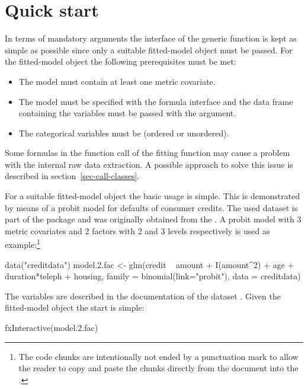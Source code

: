 \documentclass[nojss]{jss}
\begin{document}
\section{Quick start} \label{sec-quickstart}
In terms of mandatory arguments the interface of the generic function   is kept as simple as possible since only a suitable fitted-model object must be passed. For the fitted-model object the following prerequisites must be met:
\begin{itemize} [leftmargin=1cm, rightmargin=0.5cm, label=$\bullet$]
\item  The model must contain at least one metric covariate.
\item The model must be specified with the formula interface and the data frame containing the variables must be passed with the  argument.
\item The categorical variables must be  (ordered or unordered).
\end{itemize}

Some formulas in the function call of the fitting function  may cause a problem with the internal raw data extraction. A possible approach to solve this issue is described in section~\ref{sec-call-classes}.

For a suitable fitted-model object the basic usage is simple. This is demonstrated by means of a probit model for defaults of consumer credits. The used dataset   is part of the package and was originally obtained from the \citet{DataCred2014}. A probit model with 3 metric covariates and 2 factors with 2 and 3 levels respectively is used as example:\footnote{The code chunks are intentionally not ended by a punctuation mark to allow the reader to copy and paste the chunks directly from the document into the .}
%
\begin{Schunk}
\begin{Sinput}
 data("creditdata")
 model.2.fac <- glm(credit ~ amount + I(amount^2)  + age + duration*teleph  
     + housing, family = binomial(link="probit"), data = creditdata)
\end{Sinput}
\end{Schunk}
%
The variables are described in the documentation of the dataset .
Given the fitted-model object the start is simple:
%
\begin{Schunk}
\begin{Sinput}
 fxInteractive(model.2.fac) 
\end{Sinput}
\end{Schunk}
%
\end{document}
